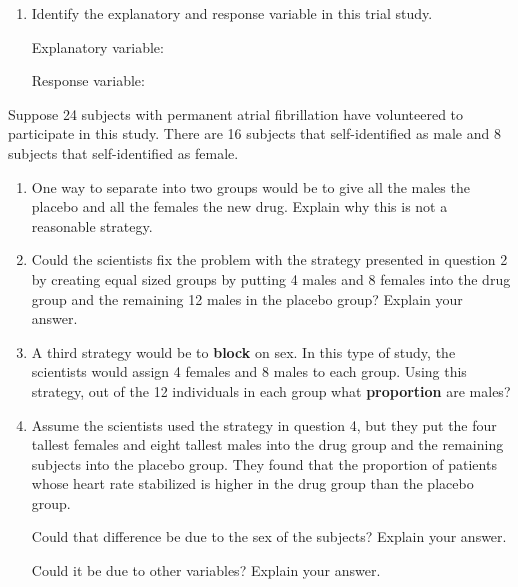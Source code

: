 \documentclass[
]{report}
\begin{document}
\begin{enumerate}
\def\labelenumi{\arabic{enumi}.}
\item
  Identify the explanatory and response variable in this trial study.

  Explanatory variable:
  \vspace{0.5in}

  Response variable:
  \vspace{0.5in}
\end{enumerate}

\newpage

Suppose 24 subjects with permanent atrial fibrillation have volunteered to participate in this study. There are 16 subjects that self-identified as male and 8 subjects that self-identified as female.

\begin{enumerate}
\def\labelenumi{\arabic{enumi}.}
\setcounter{enumi}{1}
\item
  One way to separate into two groups would be to give all the males the placebo and all the females the new drug. Explain why this is not a reasonable strategy.
  \vspace{1in}
\item
  Could the scientists fix the problem with the strategy presented in question 2 by creating equal sized groups by putting 4 males and 8 females into the drug group and the remaining 12 males in the placebo group? Explain your answer.
  \vspace{0.5in}
\item
  A third strategy would be to \textbf{block} on sex. In this type of study, the scientists would assign 4 females and 8 males to each group. Using this strategy, out of the 12 individuals in each group what \textbf{proportion} are males?
  \vspace{0.3in}
\item
  Assume the scientists used the strategy in question 4, but they put the four tallest females and eight tallest males into the drug group and the remaining subjects into the placebo group. They found that the proportion of patients whose heart rate stabilized is higher in the drug group than the placebo group.\\
  \vspace{0.1in}

  Could that difference be due to the sex of the subjects? Explain your answer.
  \vspace{0.5in}

  Could it be due to other variables? Explain your answer.
  \vspace{0.5in}
\end{enumerate}
\end{document}
